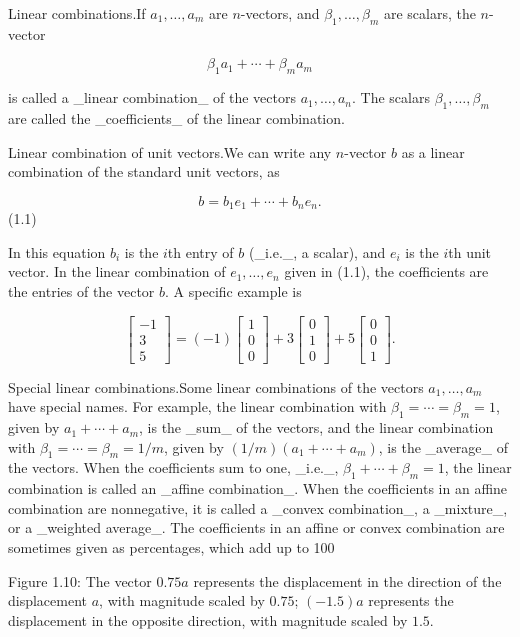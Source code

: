Linear combinations.If \(a_{1},\ldots,a_{m}\) are \(n\)-vectors, and \(\beta_{1},\ldots,\beta_{m}\) are scalars, the \(n\)-vector

\[\beta_{1}a_{1}+\cdots+\beta_{m}a_{m}\]

is called a _linear combination_ of the vectors \(a_{1},\ldots,a_{n}\). The scalars \(\beta_{1},\ldots,\beta_{m}\) are called the _coefficients_ of the linear combination.

Linear combination of unit vectors.We can write any \(n\)-vector \(b\) as a linear combination of the standard unit vectors, as

\[b=b_{1}e_{1}+\cdots+b_{n}e_{n}.\] (1.1)

In this equation \(b_{i}\) is the \(i\)th entry of \(b\) (_i.e._, a scalar), and \(e_{i}\) is the \(i\)th unit vector. In the linear combination of \(e_{1},\ldots,e_{n}\) given in (1.1), the coefficients are the entries of the vector \(b\). A specific example is

\[\left[\begin{array}{c}-1\\ 3\\ 5\end{array}\right]=(-1)\left[\begin{array}{c}1\\ 0\\ 0\end{array}\right]+3\left[\begin{array}{c}0\\ 1\\ 0\end{array}\right]+5\left[\begin{array}{c}0\\ 0\\ 1\end{array}\right].\]

Special linear combinations.Some linear combinations of the vectors \(a_{1},\ldots,a_{m}\) have special names. For example, the linear combination with \(\beta_{1}=\cdots=\beta_{m}=1\), given by \(a_{1}+\cdots+a_{m}\), is the _sum_ of the vectors, and the linear combination with \(\beta_{1}=\cdots=\beta_{m}=1/m\), given by \((1/m)(a_{1}+\cdots+a_{m})\), is the _average_ of the vectors. When the coefficients sum to one, _i.e._, \(\beta_{1}+\cdots+\beta_{m}=1\), the linear combination is called an _affine combination_. When the coefficients in an affine combination are nonnegative, it is called a _convex combination_, a _mixture_, or a _weighted average_. The coefficients in an affine or convex combination are sometimes given as percentages, which add up to 100%

Figure 1.10: The vector \(0.75a\) represents the displacement in the direction of the displacement \(a\), with magnitude scaled by \(0.75\); \((-1.5)a\) represents the displacement in the opposite direction, with magnitude scaled by \(1.5\).

 